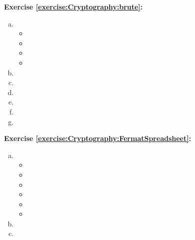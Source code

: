 \noindent\textbf{Exercise \ref{exercise:Cryptography:brute}:} %
\begin{enumerate}[(a)]
\item
\begin{itemize}
\item
\item
\item
\item
\end{itemize}
\item
\item
\item
\item
\item
\item
\end{enumerate}

\noindent\textbf{Exercise \ref{exercise:Cryptography:FermatSpreadsheet}:}
\begin{enumerate}[(a)]
\item
\begin{itemize}
\item
\item
\item
\item
\item
\item
\end{itemize}
\item
\item
\end{enumerate}

